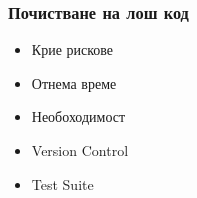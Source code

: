 \begin{frame}
  \frametitle{Почистване на лош код}
  \begin{minipage}[t]{0.48\linewidth}
    \begin{itemize}
        \item Крие рискове\pause
        \item Отнема време\pause
        \item Необоходимост\pause
    \end{itemize}
  \end{minipage}\hfill
  \begin{minipage}[t]{0.48\linewidth}
      \begin{itemize}
          \item Version Control\pause
          \item Test Suite
      \end{itemize}
  \end{minipage}
\end{frame}








